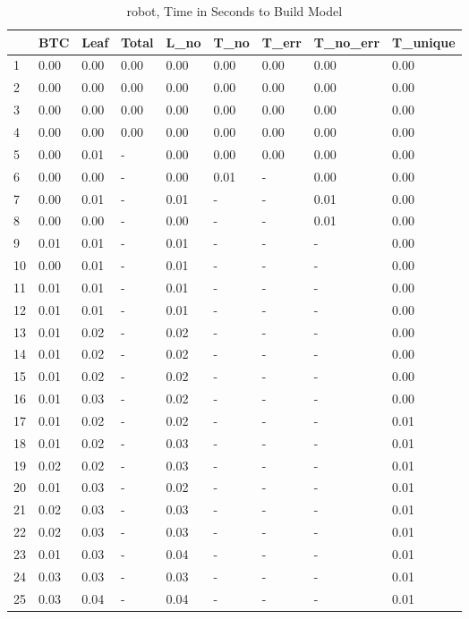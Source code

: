 \begin{table}
\centering
\caption{robot, Time in Seconds to Build Model}
\label{robot_model_time}
\begin{tabular}{lllllllll}
\toprule
{} &   BTC &  Leaf & Total &  L\_no &  T\_no & T\_err & T\_no\_err & T\_unique \\
\midrule
1  &  0.00 &  0.00 &  0.00 &  0.00 &  0.00 &  0.00 &     0.00 &     0.00 \\
2  &  0.00 &  0.00 &  0.00 &  0.00 &  0.00 &  0.00 &     0.00 &     0.00 \\
3  &  0.00 &  0.00 &  0.00 &  0.00 &  0.00 &  0.00 &     0.00 &     0.00 \\
4  &  0.00 &  0.00 &  0.00 &  0.00 &  0.00 &  0.00 &     0.00 &     0.00 \\
5  &  0.00 &  0.01 &     - &  0.00 &  0.00 &  0.00 &     0.00 &     0.00 \\
6  &  0.00 &  0.00 &     - &  0.00 &  0.01 &     - &     0.00 &     0.00 \\
7  &  0.00 &  0.01 &     - &  0.01 &     - &     - &     0.01 &     0.00 \\
8  &  0.00 &  0.00 &     - &  0.00 &     - &     - &     0.01 &     0.00 \\
9  &  0.01 &  0.01 &     - &  0.01 &     - &     - &        - &     0.00 \\
10 &  0.00 &  0.01 &     - &  0.01 &     - &     - &        - &     0.00 \\
11 &  0.01 &  0.01 &     - &  0.01 &     - &     - &        - &     0.00 \\
12 &  0.01 &  0.01 &     - &  0.01 &     - &     - &        - &     0.00 \\
13 &  0.01 &  0.02 &     - &  0.02 &     - &     - &        - &     0.00 \\
14 &  0.01 &  0.02 &     - &  0.02 &     - &     - &        - &     0.00 \\
15 &  0.01 &  0.02 &     - &  0.02 &     - &     - &        - &     0.00 \\
16 &  0.01 &  0.03 &     - &  0.02 &     - &     - &        - &     0.00 \\
17 &  0.01 &  0.02 &     - &  0.02 &     - &     - &        - &     0.01 \\
18 &  0.01 &  0.02 &     - &  0.03 &     - &     - &        - &     0.01 \\
19 &  0.02 &  0.02 &     - &  0.03 &     - &     - &        - &     0.01 \\
20 &  0.01 &  0.03 &     - &  0.02 &     - &     - &        - &     0.01 \\
21 &  0.02 &  0.03 &     - &  0.03 &     - &     - &        - &     0.01 \\
22 &  0.02 &  0.03 &     - &  0.03 &     - &     - &        - &     0.01 \\
23 &  0.01 &  0.03 &     - &  0.04 &     - &     - &        - &     0.01 \\
24 &  0.03 &  0.03 &     - &  0.03 &     - &     - &        - &     0.01 \\
25 &  0.03 &  0.04 &     - &  0.04 &     - &     - &        - &     0.01 \\
\bottomrule
\end{tabular}
\end{table}
